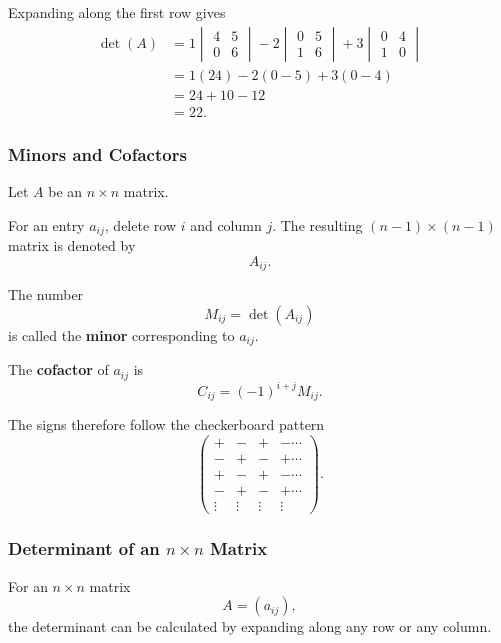 \documentclass[11pt]{article}
\theoremstyle{definition}
\theoremstyle{plain}
\theoremstyle{remark}
\begin{document}
Expanding along the first row gives
\begin{align*}
\det(A)
&=
1
\begin{vmatrix}
4&5\\
0&6
\end{vmatrix}
-
2
\begin{vmatrix}
0&5\\
1&6
\end{vmatrix}
+
3
\begin{vmatrix}
0&4\\
1&0
\end{vmatrix}
\\
&=
1(24)
-
2(0-5)
+
3(0-4)
\\
&=
24+10-12
\\
&=
22.
\end{align*}


\subsubsection*{Minors and Cofactors}


Let $A$ be an $n\times n$ matrix.

For an entry $a_{ij}$, delete row $i$ and column $j$. The resulting
$(n-1)\times(n-1)$ matrix is denoted by
\[
A_{ij}.
\]

The number
\[
M_{ij}=\det(A_{ij})
\]
is called the \textbf{minor} corresponding to $a_{ij}$.

The \textbf{cofactor} of $a_{ij}$ is
\[
{
C_{ij}=(-1)^{i+j}M_{ij}.
}
\]

The signs therefore follow the checkerboard pattern
\[
\begin{pmatrix}
+&-&+&-\cdots\\
-&+&-&+\cdots\\
+&-&+&-\cdots\\
-&+&-&+\cdots\\
\vdots&\vdots&\vdots&\vdots
\end{pmatrix}.
\]


\subsubsection*{Determinant of an $n\times n$ Matrix}

For an $n\times n$ matrix
\[
A=(a_{ij}),
\]
the determinant can be calculated by expanding along any row or any
column.
\end{document}
